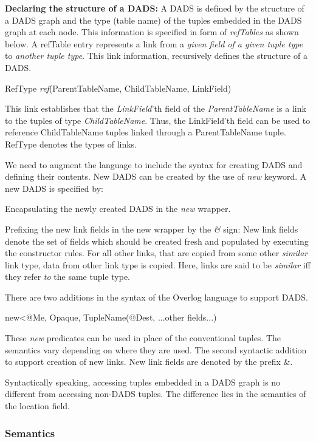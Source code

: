{\bf Declaring the structure of a DADS:} A DADS is defined by the structure of a DADS graph and the type (table name) of the tuples embedded in the DADS graph at each node. This information is specified in form of {\em refTables} as shown below. A refTable entry represents a link from a {\em given field of a given tuple type} to {\em another tuple type}. This link information, recursively defines the structure of a DADS. 

\begin{center}
RefType \textit{ref}(ParentTableName, ChildTableName, LinkField)
\end{center}

This link establishes that the {\em LinkField}'th field of the {\em ParentTableName} is a link to the tuples of type {\em ChildTableName}. Thus, the LinkField'th field can be used to reference ChildTableName tuples linked through a ParentTableName tuple. RefType denotes the types of links. 

We need to augment the language to include the syntax for creating DADS and defining their contents. New DADS can be created by the use of {\em new} keyword. A new DADS is specified by:
\be
\item Encapsulating the newly created DADS in the {\em new} wrapper.
\item Prefixing the new link fields in the new wrapper by the {\em \&} sign: New link fields denote the set of fields which should be created fresh and populated by executing the constructor rules. For all other links, that are copied from some other {\em similar} link type, data from other link type is copied. Here, links are said to be {\em similar} iff they refer {\em to} the same tuple type.
\ee

There are two additions in the syntax of the Overlog language to support DADS.
\begin{code}
new<@Me, Opaque, TupleName(@Dest, ...other fields...)
\end{code}

These {\em new} predicates can be used in place of the conventional tuples. The semantics vary depending on where they are used. The second syntactic addition to support creation of new links. New link fields are denoted by the prefix $\&$.

Syntactically speaking, accessing tuples embedded in a DADS graph is no different from accessing non-DADS tuples. The difference lies in the semantics of the location field. 

\subsubsection{Semantics}

